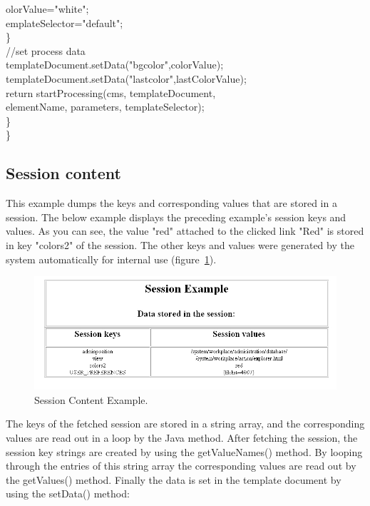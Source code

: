 \begin{java}
\jtabe                        olorValue="white";\\
\jtabe                        emplateSelector="default";\\
\jtabb        \}\\
\jtabb        //set process data\\
\jtabb        templateDocument.setData("bgcolor",colorValue);\\
\jtabb        templateDocument.setData("lastcolor",lastColorValue);\\
return startProcessing(cms, templateDocument,\\
elementName, parameters, templateSelector);\\
\}\\
\}\\
\end{java}

\subsection {Session content}

This example dumps the keys and corresponding values that are stored in
a session. The below example displays the preceding example's session
keys and values. As you can see, the value "red" attached to the clicked
link "Red" is stored in key "colors2" of the session. The other keys and
values were generated by the system automatically for internal
use (figure~\ref{SessionExample3}).

\begin{figure}
\begin{center}
\includegraphics[clip,width=\sgw]{pics/modules/36}
\end{center}
\caption[Session Content Example]{Session Content Example.}
\label{SessionExample3}
\end{figure}

The keys of the fetched session are stored in a string array, and the
corresponding values are read out in a loop by the Java method. After
fetching the session, the session key strings are created by using the
{\meth getValueNames()} method. By looping through the entries of this string
array the corresponding values are read out by the {\meth getValues()} method.
Finally the data is set in the template document by using the {\name setData()}
method:

